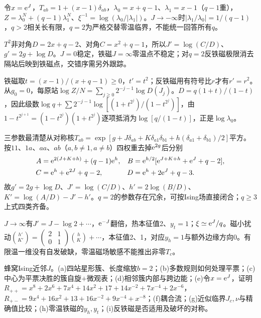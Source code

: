 \begin{solution}
令$x=\mathrm e^J$，$T_{ab}=1+(x-1)\delta_{ab}$，$\lambda_0=x+q-1$、$\lambda_1=x-1$（$q-1$重），$Z=\lambda_0^N+(q-1)\lambda_1^N$、$\xi^{-1}=\log(\lambda_0/|\lambda_1|)$。$J\to-\infty$时$|\lambda_1/\lambda_0|=1/(q-1)$，$q>2$相关长有限，$q=2$为严格交替零温临界，不能统一回答所有$q$。

$T^2$非对角$D=2x+q-2$、对角$C=x^2+q-1$，所以$J'=\log(C/D)$、$g'=2g+\log D$。$J=0$稳定，铁磁$J=\infty$零温点不稳定；对$q=2$反铁磁极限消去隔站后映到铁磁点，交错序需另外跟踪。

铁磁取$t=(x-1)/(x+q-1)\ge0$，$t'=t^2$；反铁磁用有符号比$r$才有$r'=r^2$。从$g_0=0$，每原站$\log Z/N=\sum_{j\ge0}2^{-j-1}\log D(J_j)$。$D=q(1+t)/(1-t)$，因此级数$\log q+\sum2^{-j-1}\log[(1+t^{2^j})/(1-t^{2^j})]$，由$1-t^{2^{j+1}}=(1-t^{2^j})(1+t^{2^j})$逐项抵消为$\log[q/(1-t)]$，正是$\log\lambda_0$。

三参数最清楚从对称核$T_{ab}=\exp[g+J\delta_{ab}+K\delta_{a1}\delta_{b1}+h(\delta_{a1}+\delta_{b1})/2]$平方。按$11$、$1a$、$aa$、$ab$（$a,b\ne1,a\ne b$）四权重去掉$\mathrm e^{2g}$后分别
\begin{align}
A&=\mathrm e^{2(J+K+h)}+(q-1)\mathrm e^h,& B&=\mathrm e^{h/2}[\mathrm e^{J+K+h}+\mathrm e^J+q-2],\\
C&=\mathrm e^h+\mathrm e^{2J}+q-2,&D&=\mathrm e^h+2\mathrm e^J+q-3.
\end{align}
故$g'=2g+\log D$、$J'=\log(C/D)$、$h'=2\log(B/D)$、$K'=\log(A/D)-J'-h'$。$q=2$的参数存在冗余，可按Ising场直接闭合；$q\ge3$上式四类齐备。

$J\to\infty$有$J'=J-\log2+\cdots$，$\mathrm e^{-J}$翻倍，热本征值2、$y_t=1$；$\xi\simeq\mathrm e^J/q$。磁小扰动$\binom{h'}{K'}=\left(\begin{smallmatrix}2&1\\0&1\end{smallmatrix}\right)\binom hK+\cdots$，本征值2、1，对应$y_h=1$与额外边缘方向0。有限温一维没有自发破缺，零温磁场敏感不能推出非零$T_c$。
\end{solution}
\begin{exercise}[原题6(a)--(i)]\label{p:334-4-6}
蜂窝Ising近邻$J$。(a)四站星形簇、长度缩放$b=2$；(b)多数规则如何处理平票；(c)中心为平票决胜的簇自旋$+$微观表；(d)相邻簇内部与跨边能；(e)令$x=\mathrm e^J$，证明$R_{++}=x^8+2x^6+7x^4+14x^2+17+14x^{-2}+7x^{-4}+2x^{-6}$，$R_{+-}=9x^4+16x^2+13+16x^{-2}+9x^{-4}+x^{-8}$；(f)耦合流；(g)近似临界$J_c,\nu$与精确值比较；(h)零温铁磁的$y_h,y_t$；(i)反铁磁是否适用及破坏的对称。
\end{exercise}
